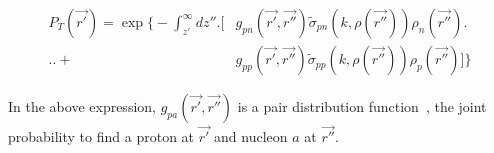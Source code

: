 \begin{equation}
\begin{aligned}
    P_{T}(\vec{r'}) = \exp \biggl\{-\int_{z'}^{\infty} dz'' \biggr.\biggl[&g_{p n}(\vec{r'}, \vec{r''}) \widetilde{\sigma}_{p n}\left(k, \rho(\vec{r''})\right) \rho_{n}(\vec{r''})\biggr.\\
                                                           \biggl.\biggl.+&g_{p p}(\vec{r'}, \vec{r''}) \widetilde{\sigma}_{p p}\left(k, \rho(\vec{r''})\right) \rho_{p}(\vec{r''})\biggr]\biggr\}
\end{aligned}
\end{equation}


In the above expression, $g_{pa}(\vec{r'},\vec{r''})$ is a pair distribution
function~\cite{Schiavilla_1987}, the joint probability to find a proton at
$\vec{r'}$ and nucleon $a$ at $\vec{r''}$.

